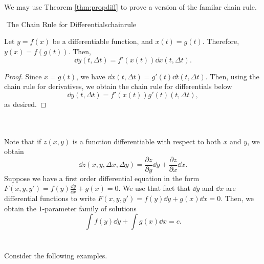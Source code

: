     \vphantom
    \\
    \\
    We may use Theorem \ref{thm:propdiff} to prove a version of the familar chain rule.
    \begin{theorem}{\Stop\,\,The Chain Rule for Differentials}{chainrule}

        Let \(y=f(x)\) be a differentiable function, and \(x(t)=g(t)\). Therefore, \(y(x)=f(g(t))\). Then,
        \begin{equation*}
            \dd y(t,\Delta t)=f'(x(t))\dd x(t,\Delta t).
        \end{equation*}
        \begin{proof}
            Since \(x=g(t)\), we have \(\dd x(t, \Delta t)=g'(t)\dd t(t, \Delta t)\). Then, using the chain rule for derivatives, we obtain the chain rule for differentials below
            \begin{equation*}
                \dd y(t,\Delta t)=f'(x(t))g'(t)(t,\Delta t),
            \end{equation*}
            as desired.
        \end{proof}
        
    \end{theorem}
    \vphantom
    \\
    \\
    Note that if \(z(x,y)\) is a function differentiable with respect to both \(x\) and \(y\), we obtain
    \begin{equation*}
        \dd z(x,y,\Delta x,\Delta y)=\frac{\partial z}{\partial y}\dd y+\frac{\partial z}{\partial x}\dd x.
    \end{equation*}
    Suppose we have a first order differential equation in the form \(F(x,y,y')=f(y)\frac{\dd y}{\dd x}+g(x)=0\). We use that fact that \(\dd y\) and \(\dd x\) are differential functions to write \(F(x,y,y')=f(y)\dd y+g(x)\dd x=0\). Then, we obtain the \(1\)-parameter family of solutions
    \begin{equation*}
        \int f(y)\dd y+\int g(x)\dd x=c.
    \end{equation*}
    \pagebreak
    \vphantom
    \\
    \\
    Consider the following examples.
